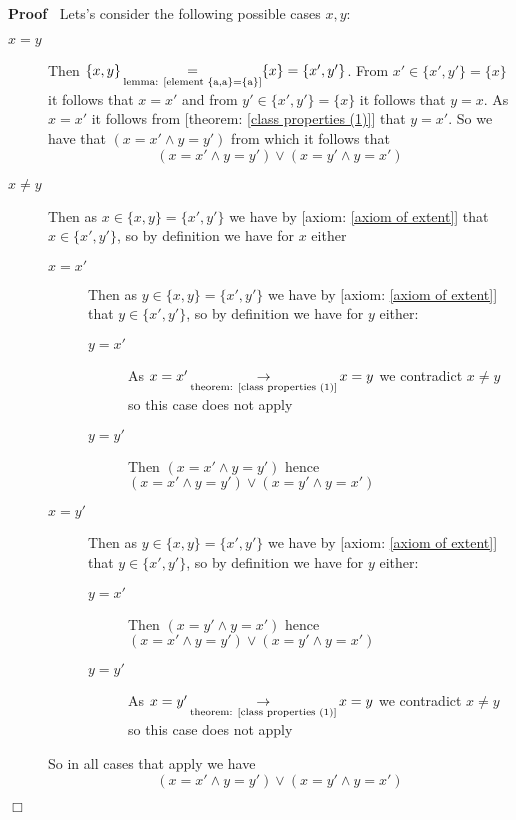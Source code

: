 \documentclass{book}
\newcommand{\Rightarrowlim}{\mathop{\rightarrow}\limits}
\newcommand{\equallim}{\mathop{=}\limits}
\newenvironment{proof}{\noindent\textbf{Proof\ }}{\hspace*{\fill}$\Box$\medskip}
\begin{document}
\begin{proof}
  Lets's consider the following possible cases $x, y$:
  \begin{description}
    \item[$x = y$] Then $\{ x, y \} \equallim_{\text{lemma: \ref{element
    {a,a}={a}}}} \{ x \} = \{ x', y' \}$. From $x' \in \{ x', y' \} = \{ x \}$
    it follows that $x = x'$ and from $y' \in \{ x', y' \} = \{ x \}$ it
    follows that $y = x$. As $x = x'$ it follows from [theorem: \ref{class
    properties (1)}] that $y = x'$. So we have that $(x = x' \wedge y = y')$
    from which it follows that
    \[ (x = x' \wedge y = y') \vee (x = y' \wedge y = x') \]
    \item[$x \neq y$] Then as $x \in \{ x, y \} = \{ x', y' \}$ we have by
    [axiom: \ref{axiom of extent}] that $x \in \{ x', y' \}$, so by definition
    we have for $x$ either
    \begin{description}
      \item[$x = x'$] Then as $y \in \{ x, y \} = \{ x', y' \}$ we have by
      [axiom: \ref{axiom of extent}] that $y \in \{ x', y' \}$, so by
      definition we have for $y$ either:
      \begin{description}
        \item[$y = x'$] As $x = x' \Rightarrowlim_{\text{theorem: \ref{class
        properties (1)}}} x = y$ we contradict $x \neq y$ so this case does
        not apply
        
        \item[$y = y'$] Then $(x = x' \wedge y = y')$ hence $(x = x' \wedge y
        = y') \vee (x = y' \wedge y = x')$
      \end{description}
      \item[$x = y'$] Then as $y \in \{ x, y \} = \{ x', y' \}$ we have by
      [axiom: \ref{axiom of extent}] that $y \in \{ x', y' \}$, so by
      definition we have for $y$ either:
      \begin{description}
        \item[$y = x'$] Then $(x = y' \wedge y = x')$ hence $(x = x' \wedge y
        = y') \vee (x = y' \wedge y = x')$
        
        \item[$y = y'$] As $x = y' \Rightarrowlim_{\text{theorem: \ref{class
        properties (1)}}} x = y$ we contradict $x \neq y$ so this case does
        not apply
      \end{description}
    \end{description}
    So in all cases that apply we have
    \[ (x = x' \wedge y = y') \vee (x = y' \wedge y = x') \]
  \end{description}
\end{proof}
\end{document}
